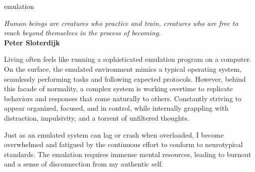 



\begin{center}
\vspace*{\fill}
\Huge{emulation}

\vspace{2cm}

\begin{flushright}
\large{
\textit{ Human beings are creatures who practice and train, creatures who are free to reach beyond themselves in the process of becoming.}\\
\textbf{ Peter Sloterdijk }}
\end{flushright}

\vspace*{\fill}
\end{center}


Living often feels like running a sophisticated emulation program on a computer. On the surface, the emulated environment mimics a typical operating system, seamlessly performing tasks and following expected protocols. However, behind this facade of normality, a complex system is working overtime to replicate behaviors and responses that come naturally to others. Constantly striving to appear organized, focused, and in control, while internally grappling with distraction, impulsivity, and a torrent of unfiltered thoughts.

Just as an emulated system can lag or crash when overloaded, I become overwhelmed and fatigued by the continuous effort to conform to neurotypical standards. The emulation requires immense mental resources, leading to burnout and a sense of disconnection from my authentic self.
